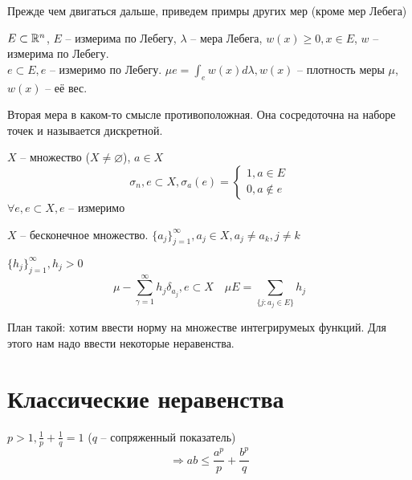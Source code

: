 \documentclass[document]{subfiles}
\begin{document}
Прежде чем двигаться дальше, приведем примры других мер (кроме мер Лебега)
\begin{example}
    $E \subset \mathbb{R}^n$, $E$ -- измерима по Лебегу, $\lambda$ -- мера Лебега, $w(x) \geq 0, x \in E$, $w$ -- измерима по Лебегу. \\
    
    $e \subset E, e$ -- измеримо по Лебегу.
    $ \mu e = \int_e w(x) d \lambda, w(x)$ -- плотность меры $\mu$, $w(x)$ -- её вес.
\end{example}
Вторая мера в каком-то смысле противоположная. Она сосредоточна на наборе точек и называется дискретной.
\begin{example}
    $X$ -- множество ($X \ne \varnothing$), $a \in X$
    \[ \sigma_n, e \subset X, \sigma_a(e) = \begin{cases}
        1, a \in E \\
        0, a \notin e 
    \end{cases} \] 
    $\forall e, e \subset  X, e$ -- измеримо
\end{example}

\begin{example}
    $X$ -- бесконечное множество. $ \{ a_j \}_{j=1}^\infty, a_j \in X, a_j \ne a_k, j \ne k$ 
    
    $\{h_j \}^\infty_{j=1}, h_j > 0$ 
    \[ \mu - \sum^\infty_{\gamma = 1} h_j \delta_{a_j}, e \subset X \quad \mu E = \sum_{\{ j: a_j \in E \}} h_j \]
\end{example}

План такой: хотим ввести норму на множестве интегрирумеых функций. Для этого нам надо ввести некоторые неравенства.
\section{Классические неравенства}

\begin{theorem}
    $p > 1, \frac{1}{p} + \frac{1}{q} = 1$ ($q$ -- сопряженный показатель)
    \[ \Rightarrow ab \leq \frac{a^p}{p} + \frac{b^p}{q} \]
\end{theorem}
\end{document}
